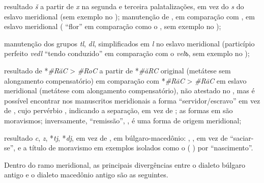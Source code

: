 \begin{compactitem}[--]
	\item resultado \emph{š} a partir de \emph{x} na segunda e terceira
	palatalizações, em vez do \emph{s} do eslavo meridional (sem exemplo no
	); manutenção de ,  em comparação
	com ,  em eslavo meridional (
	 ``flor'' em comparação como o  ,
	sem exemplo no );
	\item manutenção dos grupos \emph{tl}, \emph{dl}, simplificados em \emph{l} no
	eslavo meridional (particípio perfeito  \emph{vedl}
	``tendo conduzido'' em comparação com o  \emph{velъ}, sem
	exemplo no );
	\item resultado de *\emph{\#RăC} > \emph{\#RoC} a partir de *\emph{\#ăRC}
	original (metátese sem alongamento compensatório) em comparação com
	*\emph{\#RāC} > \emph{\#RāC} em eslavo meridional (metátese com alongamento
	compensatório), não atestado no , mas é
	possível encontrar nos manuscritos meridionais a forma
	 ``servidor\slash{}escravo'' em vez de
	, cujo pervérbio , indicando a
	separação, em vez de ; as formas em  são
	moravismos; inversamente,  ``remissão'',
	, é uma forma de origem meridional;
	\item resultado \emph{c}, \emph{z}, *\emph{tj}, *\emph{dj}, em vez de
	,  em búlgaro-macedônio:
	, , em vez de  ``saciar-se'', e a título
	de moravismo em exemplos isolados como o  
	(
	) por  ``nascimento''.
\end{compactitem}

Dentro do ramo meridional, as principais divergências entre o dialeto búlgaro antigo e o dialeto macedônio antigo são as seguintes.

